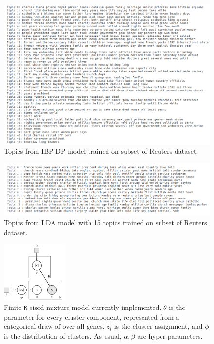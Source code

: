 \documentclass{article}
\begin{document}
\begin{figure}
    \centering
    \includegraphics[width=1\textwidth]{figs/ibptopics}
    \caption{Topics from IBP-DP model trained on subset of Reuters dataset.}
    \label{fig:ibptopics}
\end{figure}

\begin{figure}
    \centering
    \includegraphics[width=1\textwidth]{figs/ldatopics}
    \caption{Topics from LDA model with 15 topics trained on subset of Reuters dataset.}
    \label{fig:ldatopics}
\end{figure}

\begin{figure}
    \centering
    \includegraphics[width=0.3\textwidth]{figs/mixture}
    \caption{Finite \texttt{K}-sized mixture model currently implemented. $\theta$ is the parameter for every cluster component, represented from a categorical draw of over all genes. $z_i$ is the cluster assignment, and $\phi$ is the distribution of clusters. As usual, $\alpha, \beta$ are hyper-parameters.}
    \label{fig:plate}
\end{figure}
\end{document}
